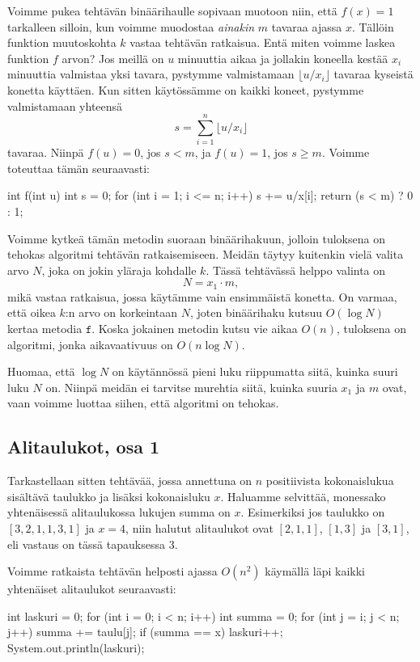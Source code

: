 Voimme pukea tehtävän binäärihaulle sopivaan muotoon niin,
että $f(x)=1$ tarkalleen silloin, kun voimme muodostaa
\emph{ainakin} $m$ tavaraa ajassa $x$.
Tällöin funktion muutoskohta $k$ vastaa tehtävän ratkaisua.
Entä miten voimme laskea funktion $f$ arvon?
Jos meillä on $u$ minuuttia aikaa ja jollakin koneella kestää $x_i$
minuuttia valmistaa yksi tavara, pystymme valmistamaan
$\lfloor u/x_i \rfloor$ tavaraa kyseistä konetta käyttäen.
Kun sitten käytössämme on kaikki koneet,
pystymme valmistamaan yhteensä
\[ s = \sum_{i=1}^n \lfloor u/x_i \rfloor \]
tavaraa. Niinpä $f(u)=0$, jos $s<m$,
ja $f(u)=1$, jos $s \ge m$. Voimme toteuttaa tämän seuraavasti:

\begin{code}
int f(int u) {
    int s = 0;
    for (int i = 1; i <= n; i++) s += u/x[i];
    return (s < m) ? 0 : 1;
}
\end{code}

Voimme kytkeä tämän metodin suoraan binäärihakuun,
jolloin tuloksena on tehokas algoritmi tehtävän ratkaisemiseen.
Meidän täytyy kuitenkin vielä valita arvo $N$,
joka on jokin yläraja kohdalle $k$.
Tässä tehtävässä helppo valinta on
\[N = x_1 \cdot m,\]
mikä vastaa ratkaisua, jossa käytämme vain ensimmäistä konetta.
On varmaa, että oikea $k$:n arvo on korkeintaan $N$,
joten binäärihaku kutsuu $O(\log N)$ kertaa metodia $\texttt{f}$.
Koska jokainen metodin kutsu vie aikaa $O(n)$,
tuloksena on algoritmi, jonka aikavaativuus on $O(n \log N)$.

Huomaa, että $\log N$ on käytännössä pieni luku riippumatta
siitä, kuinka suuri luku $N$ on.
Niinpä meidän ei tarvitse murehtia siitä,
kuinka suuria $x_1$ ja $m$ ovat,
vaan voimme luottaa siihen, että algoritmi on tehokas.

\subsection{Alitaulukot, osa 1}

Tarkastellaan sitten tehtävää, jossa annettuna on $n$
positiivista kokonaislukua sisältävä taulukko ja lisäksi kokonaisluku $x$.
Haluamme selvittää, monessako yhtenäisessä alitaulukossa
lukujen summa on $x$.
Esimerkiksi jos taulukko on $[3,2,1,1,3,1]$ ja $x=4$,
niin halutut alitaulukot ovat $[2,1,1]$, $[1,3]$ ja $[3,1]$,
eli vastaus on tässä tapauksessa $3$.

Voimme ratkaista tehtävän helposti ajassa $O(n^2)$
käymällä läpi kaikki yhtenäiset alitaulukot seuraavasti:

\begin{code}
int laskuri = 0;
for (int i = 0; i < n; i++) {
    int summa = 0;
    for (int j = i; j < n; j++) {
        summa += taulu[j];
        if (summa == x) laskuri++;
    }
}
System.out.println(laskuri);
\end{code}

